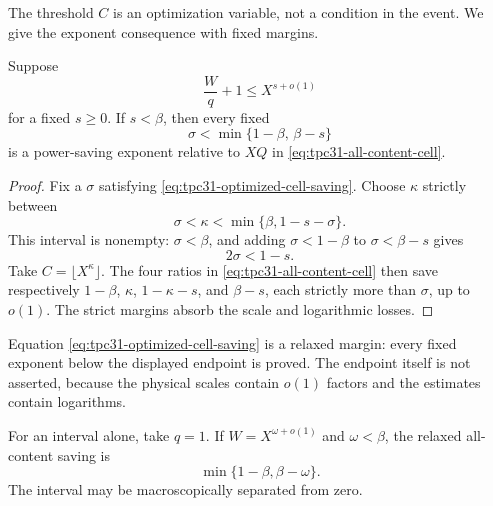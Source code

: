 The threshold $C$ is an optimization variable, not a condition in
the event.  We give the exponent consequence with fixed margins.

\begin{corollary}
\label{cor:tpc31-optimized-cell}
Suppose
\begin{equation}
 \frac Wq+1\le X^{s+o(1)}
 \label{eq:tpc31-cell-capacity-exponent}
\end{equation}
for a fixed $s\ge0$.  If $s<\beta$, then every fixed
\begin{equation}
 \boxed{
 \sigma<\min\{1-\beta,\,\beta-s\}}
 \label{eq:tpc31-optimized-cell-saving}
\end{equation}
is a power-saving exponent relative to $XQ$ in
\eqref{eq:tpc31-all-content-cell}.
\end{corollary}

\begin{proof}
Fix a $\sigma$ satisfying
\eqref{eq:tpc31-optimized-cell-saving}.  Choose $\kappa$ strictly
between
\begin{equation}
 \sigma<\kappa<\min\{\beta,1-s-\sigma\}.
 \label{eq:tpc31-kappa-feasibility}
\end{equation}
This interval is nonempty: $\sigma<\beta$, and adding
$\sigma<1-\beta$ to $\sigma<\beta-s$ gives
\begin{equation}
 2\sigma<1-s.
 \label{eq:tpc31-kappa-average}
\end{equation}
Take $C=\lfloor X^\kappa\rfloor$.  The four ratios in
\eqref{eq:tpc31-all-content-cell} then save respectively
$1-\beta$, $\kappa$, $1-\kappa-s$, and $\beta-s$, each strictly more
than $\sigma$, up to $o(1)$.  The strict margins absorb the scale and
logarithmic losses.
\end{proof}

\begin{remark}
\label{rem:tpc31-relaxed-endpoint}
Equation \eqref{eq:tpc31-optimized-cell-saving} is a relaxed margin:
every fixed exponent below the displayed endpoint is proved.  The
endpoint itself is not asserted, because the physical scales contain
$o(1)$ factors and the estimates contain logarithms.
\end{remark}

For an interval alone, take $q=1$.  If
$W=X^{\omega+o(1)}$ and $\omega<\beta$, the relaxed all-content
saving is
\begin{equation}
 \min\{1-\beta,\beta-\omega\}.
 \label{eq:tpc31-all-window-saving}
\end{equation}
The interval may be macroscopically separated from zero.

